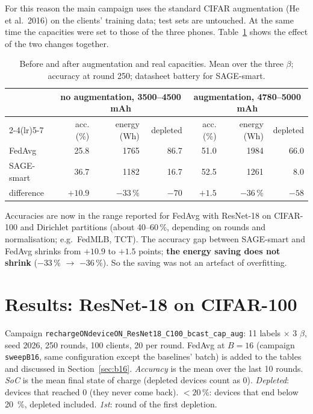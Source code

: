 \documentclass[11pt,a4paper]{article}
\begin{document}
For this reason the main campaign uses the standard CIFAR augmentation (He et
al.\ 2016) on the clients' training data; test sets are untouched. At the same
time the capacities were set to those of the three phones.
Table~\ref{tab:before_after} shows the effect of the two changes together.

\begin{table}[H]
\centering
\caption{Before and after augmentation and real capacities. Mean over the
three $\beta$; accuracy at round 250; datasheet battery for SAGE-smart.}
\label{tab:before_after}
\begin{tabular}{lrrrrrr}
\toprule
& \multicolumn{3}{c}{no augmentation, 3500--4500 mAh} & \multicolumn{3}{c}{augmentation, 4780--5000 mAh} \\
\cmidrule(lr){2-4}\cmidrule(lr){5-7}
& acc. (\%) & energy (Wh) & depleted & acc. (\%) & energy (Wh) & depleted \\
\midrule
FedAvg     & 25.8 & 1765 & 86.7 & 51.0 & 1984 & 66.0 \\
SAGE-smart & 36.7 & 1182 & 16.7 & 52.5 & 1261 &  8.0 \\
\midrule
difference & $+10.9$ & $-33\,\%$ & $-70$ & $+1.5$ & $-36\,\%$ & $-58$ \\
\bottomrule
\end{tabular}
\end{table}

Accuracies are now in the range reported for FedAvg with ResNet-18 on
CIFAR-100 and Dirichlet partitions (about 40--60\,\%, depending on rounds and
normalisation; e.g.\ FedMLB, TCT). The
accuracy gap between SAGE-smart and FedAvg shrinks from $+10.9$ to $+1.5$
points; \textbf{the energy saving does not shrink} ($-33\,\%$ $\to$ $-36\,\%$).
So the saving was not an artefact of overfitting.

\section{Results: ResNet-18 on CIFAR-100}
\label{sec:results}

Campaign \texttt{rechargeONdeviceON\_ResNet18\_C100\_bcast\_cap\_aug}: 11
labels $\times$ 3 $\beta$, seed 2026, 250 rounds, 100 clients, 20 per round.
FedAvg at $B=16$ (campaign \texttt{sweepB16}, same configuration except the
baselines' batch) is added to the tables and discussed in
Section~\ref{sec:b16}.
\emph{Accuracy} is the mean over the last 10 rounds. \emph{SoC} is the mean
final state of charge (depleted devices count as 0). \emph{Depleted}: devices
that reached 0 (they never come back). \emph{$<20\,\%$}: devices that end below
\SI{20}{\percent}, depleted included. \emph{1st}: round of the first depletion.
\end{document}
